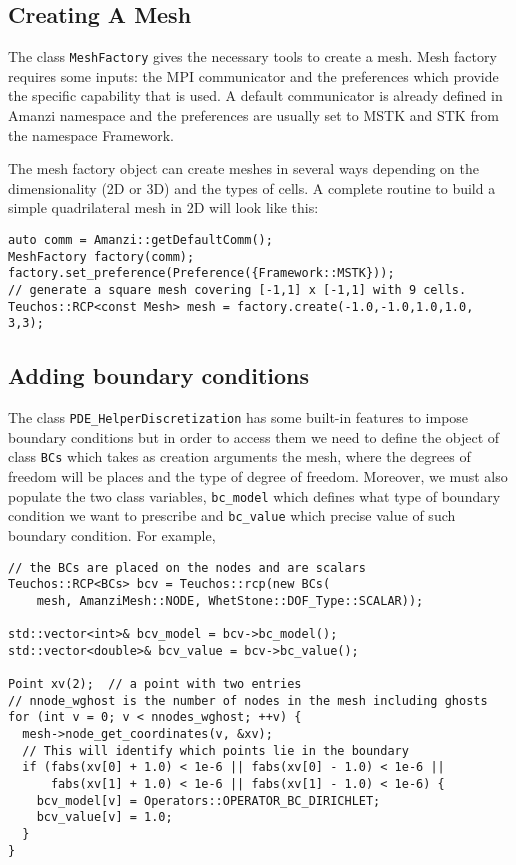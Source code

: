 \subsection{Creating A Mesh}\label{CreatingAMesh}
The class {\tt MeshFactory} gives the necessary tools to create a mesh. 
Mesh factory requires some inputs: the MPI communicator and the preferences which provide the specific capability that is used. 
A default communicator is already defined in Amanzi namespace and the preferences are usually set 
to MSTK and STK from the namespace Framework.

The mesh factory object can create meshes in several ways depending on the dimensionality (2D or 3D) and the types of cells. 
A complete routine to build a simple quadrilateral mesh in 2D will look like this: 
%
\begin{lstlisting}
auto comm = Amanzi::getDefaultComm();
MeshFactory factory(comm);
factory.set_preference(Preference({Framework::MSTK}));
// generate a square mesh covering [-1,1] x [-1,1] with 9 cells.
Teuchos::RCP<const Mesh> mesh = factory.create(-1.0,-1.0,1.0,1.0, 3,3);
\end{lstlisting}


\subsection{Adding boundary conditions}\label{Sec:AddingBoundaryCond}
The class {\tt PDE\_HelperDiscretization} has some built-in features to impose boundary conditions 
but in order to access them we need to define the object of class {\tt BCs} which takes as 
creation arguments the mesh, where the degrees of freedom will be places and the type of degree 
of freedom.
% 
Moreover, we must also populate the two class variables, {\tt bc\_model} which defines what 
type of boundary condition we want to prescribe and {\tt bc\_value} which precise value of such 
boundary condition.
%
For example,
%
\begin{lstlisting}
// the BCs are placed on the nodes and are scalars
Teuchos::RCP<BCs> bcv = Teuchos::rcp(new BCs(
    mesh, AmanziMesh::NODE, WhetStone::DOF_Type::SCALAR));

std::vector<int>& bcv_model = bcv->bc_model();
std::vector<double>& bcv_value = bcv->bc_value();

Point xv(2);  // a point with two entries
// nnode_wghost is the number of nodes in the mesh including ghosts
for (int v = 0; v < nnodes_wghost; ++v) {
  mesh->node_get_coordinates(v, &xv);
  // This will identify which points lie in the boundary
  if (fabs(xv[0] + 1.0) < 1e-6 || fabs(xv[0] - 1.0) < 1e-6 ||
      fabs(xv[1] + 1.0) < 1e-6 || fabs(xv[1] - 1.0) < 1e-6) {
    bcv_model[v] = Operators::OPERATOR_BC_DIRICHLET;
    bcv_value[v] = 1.0;
  }
}
\end{lstlisting}
%
